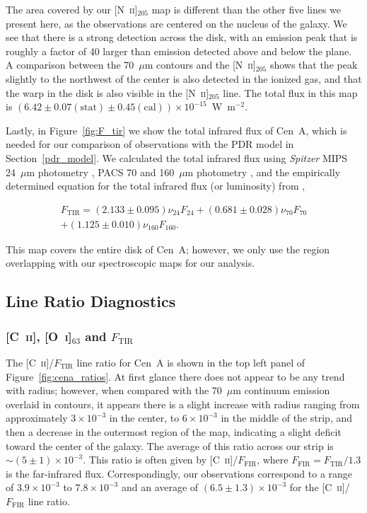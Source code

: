 \documentclass[preprint2]{aastex}
\begin{document}
The area covered by our [N~\textsc{ii}]$_{205}$ map is different than the other five lines we present here, as the observations are centered on the nucleus of the galaxy.  We see that there is a strong detection across the disk, with an emission peak that is roughly a factor of 40 larger than emission detected above and below the plane.  A comparison between the 70~$\mu$m contours and the [N~\textsc{ii}]$_{205}$ shows that the peak slightly to the northwest of the center is also detected in the ionized gas, and that the warp in the disk is also visible in the [N~\textsc{ii}]$_{205}$ line.  The total flux in this map is $(6.42 \pm 0.07 (\mathrm{stat}) \pm 0.45 (\mathrm{cal})) \times 10^{-15}$~W~m$^{-2}$.

Lastly, in Figure~\ref{fig:F_tir} we show the total infrared flux of Cen~A, which is needed for our comparison of observations with the PDR model in Section~\ref{pdr_model}.  We calculated the total infrared flux using \emph{Spitzer} MIPS 24~$\mu$m photometry \citep{2012MNRAS.423..197B}, PACS 70 and 160~$\mu$m photometry \citep{2012MNRAS.422.2291P}, and the empirically determined equation for the total infrared flux (or luminosity) from \citet{2013MNRAS.431.1956G},

\begin{eqnarray}\label{eqn:Ftir}
F_{\mathrm{TIR}} = (2.133 \pm 0.095)\nu_{24} F_{24} + (0.681 \pm 0.028)\nu_{70} F_{70}
	\nonumber \\
	+ (1.125 \pm 0.010) \nu_{160} F_{160}.
\end{eqnarray}

This map covers the entire disk of Cen~A; however, we only use the region overlapping with our spectroscopic maps for our analysis.

\subsection{Line Ratio Diagnostics}\label{subsec:ratio}
\subsubsection{[C~\textsc{ii}], [O~\textsc{i}]$_{63}$ and $F_{\mathrm{TIR}}$}
The [C~\textsc{ii}]/$F_{\mathrm{TIR}}$ line ratio for Cen~A is shown in the top left panel of Figure~\ref{fig:cena_ratios}.  At first glance there does not appear to be any trend with radius; however, when compared with the 70~$\mu$m continuum emission overlaid in contours, it appears there is a slight increase with radius ranging from approximately $3 \times 10^{-3}$ in the center, to $6 \times 10^{-3}$ in the middle of the strip, and then a decrease in the outermost region of the map, indicating a slight deficit toward the center of the galaxy.  The average of this ratio across our strip is $\sim (5 \pm 1) \times 10^{-3}$.  This ratio is often given by  [C~\textsc{ii}]/$F_{\mathrm{FIR}}$, where $F_{\mathrm{FIR}} = F_{\mathrm{TIR}}/1.3$ \citep{2008A&A...479..703G} is the far-infrared flux.  Correspondingly, our observations correspond to a range of $3.9 \times 10^{-3}$ to $7.8 \times 10^{-3}$ and an average of $(6.5 \pm 1.3)\times 10^{-3}$ for the [C~\textsc{ii}]/$F_{\mathrm{FIR}}$ line ratio.
\end{document}
